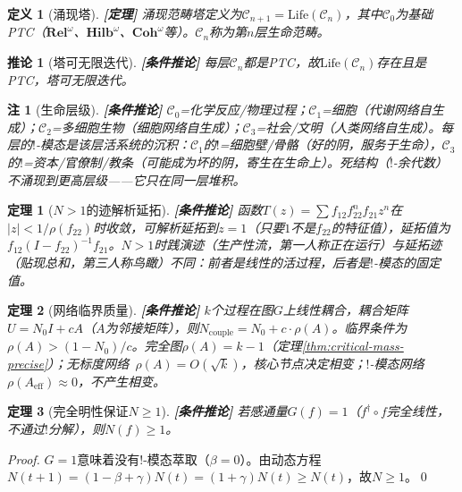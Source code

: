 \documentclass[11pt,a4paper]{article}
\newtheorem{definition}{定义}
\newtheorem{theorem}{定理}
\newtheorem{corollary}{推论}
\newtheorem{remark}{注}
\newcommand{\lvl}[1]{\hfill\textbf{\footnotesize[#1]}}
\newcommand{\lvP}{\lvl{定理}}
\newcommand{\lvC}{\lvl{条件推论}}
\newcommand{\bang}{{!}}
\begin{document}
\begin{definition}[涌现塔]\label{def:emergence-tower}\lvP
涌现范畴塔定义为$\mathcal{C}_{n+1}=\mathrm{Life}(\mathcal{C}_n)$，其中$\mathcal{C}_0$为基础PTC（$\mathbf{Rel}^\omega$、$\mathbf{Hilb}^\omega$、$\mathbf{Coh}^\omega$等）。$\mathcal{C}_n$称为第$n$层生命范畴。
\end{definition}

\begin{corollary}[塔可无限迭代]\label{cor:tower-infinite}\lvC
每层$\mathcal{C}_n$都是PTC，故$\mathrm{Life}(\mathcal{C}_n)$存在且是PTC，塔可无限迭代。
\end{corollary}

\begin{remark}[生命层级]\lvC
$\mathcal{C}_0$=化学反应/物理过程；$\mathcal{C}_1$=细胞（代谢网络自生成）；$\mathcal{C}_2$=多细胞生物（细胞网络自生成）；$\mathcal{C}_3$=社会/文明（人类网络自生成）。每层的$\bang$-模态是该层活系统的沉积：$\mathcal{C}_1$的$\bang$=细胞壁/骨骼（好的阴，服务于生命），$\mathcal{C}_3$的$\bang$=资本/官僚制/教条（可能成为坏的阴，寄生在生命上）。死结构（$\bang$-余代数）不涌现到更高层级——它只在同一层堆积。
\end{remark}

\begin{theorem}[$N>1$的迹解析延拓]\label{thm:trace-analytic}\lvC
函数$T(z)=\sum f_{12}f_{22}^nf_{21}z^n$在$|z|<1/\rho(f_{22})$时收敛，可解析延拓到$z=1$（只要$1$不是$f_{22}$的特征值），延拓值为$f_{12}(I-f_{22})^{-1}f_{21}$。$N>1$时践演迹（生产性流，第一人称正在运行）与延拓迹（贴现总和，第三人称鸟瞰）不同：前者是线性的活过程，后者是$\bang$-模态的固定值。
\end{theorem}

\begin{theorem}[网络临界质量]\label{thm:network-critical}\lvC
$k$个过程在图$G$上线性耦合，耦合矩阵$U=N_0I+cA$（$A$为邻接矩阵），则$N_{\mathrm{couple}}=N_0+c\cdot\rho(A)$。临界条件为$\rho(A)>(1-N_0)/c$。完全图$\rho(A)=k-1$（定理\ref{thm:critical-mass-precise}）；无标度网络~\cite{may99}$\rho(A)=O(\sqrt{k})$，核心节点决定相变；$\bang$-模态网络$\rho(A_{\mathrm{eff}})\approx0$，不产生相变。
\end{theorem}

\begin{theorem}[完全明性保证$N\geq1$]\label{thm:g1-n1}\lvC
若感通量$G(f)=1$（$f^\dagger\circ f$完全线性，不通过$\bang$分解），则$N(f)\geq1$。
\end{theorem}

\begin{proof}
$G=1$意味着没有$\bang$-模态萃取（$\beta=0$）。由动态方程$N(t+1)=(1-\beta+\gamma)N(t)=(1+\gamma)N(t)\geq N(t)$，故$N\geq1$。\qed
\end{proof}
\end{document}
